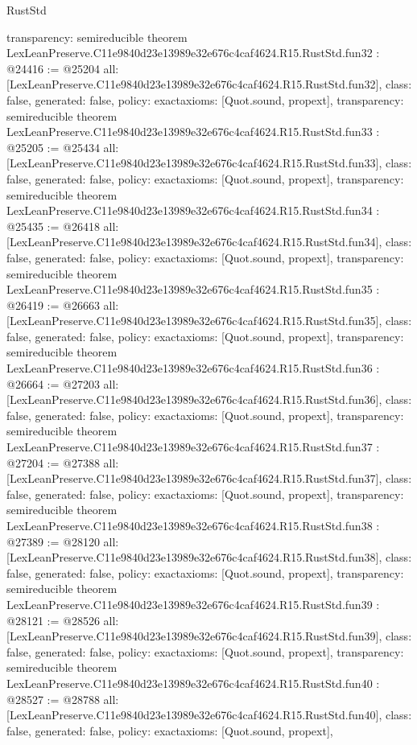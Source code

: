 \begin{lexlean}{RustStd}
\begin{coremodule}
{  transparency: semireducible
}
theorem LexLeanPreserve.C11e9840d23e13989e32e676c4caf4624.R15.RustStd.fun32 : @24416 := @25204 {
  all: [LexLeanPreserve.C11e9840d23e13989e32e676c4caf4624.R15.RustStd.fun32],
  class: false,
  generated: false,
  policy: exact{axioms: [Quot.sound, propext]},
  transparency: semireducible
}
theorem LexLeanPreserve.C11e9840d23e13989e32e676c4caf4624.R15.RustStd.fun33 : @25205 := @25434 {
  all: [LexLeanPreserve.C11e9840d23e13989e32e676c4caf4624.R15.RustStd.fun33],
  class: false,
  generated: false,
  policy: exact{axioms: [Quot.sound, propext]},
  transparency: semireducible
}
theorem LexLeanPreserve.C11e9840d23e13989e32e676c4caf4624.R15.RustStd.fun34 : @25435 := @26418 {
  all: [LexLeanPreserve.C11e9840d23e13989e32e676c4caf4624.R15.RustStd.fun34],
  class: false,
  generated: false,
  policy: exact{axioms: [Quot.sound, propext]},
  transparency: semireducible
}
theorem LexLeanPreserve.C11e9840d23e13989e32e676c4caf4624.R15.RustStd.fun35 : @26419 := @26663 {
  all: [LexLeanPreserve.C11e9840d23e13989e32e676c4caf4624.R15.RustStd.fun35],
  class: false,
  generated: false,
  policy: exact{axioms: [Quot.sound, propext]},
  transparency: semireducible
}
theorem LexLeanPreserve.C11e9840d23e13989e32e676c4caf4624.R15.RustStd.fun36 : @26664 := @27203 {
  all: [LexLeanPreserve.C11e9840d23e13989e32e676c4caf4624.R15.RustStd.fun36],
  class: false,
  generated: false,
  policy: exact{axioms: [Quot.sound, propext]},
  transparency: semireducible
}
theorem LexLeanPreserve.C11e9840d23e13989e32e676c4caf4624.R15.RustStd.fun37 : @27204 := @27388 {
  all: [LexLeanPreserve.C11e9840d23e13989e32e676c4caf4624.R15.RustStd.fun37],
  class: false,
  generated: false,
  policy: exact{axioms: [Quot.sound, propext]},
  transparency: semireducible
}
theorem LexLeanPreserve.C11e9840d23e13989e32e676c4caf4624.R15.RustStd.fun38 : @27389 := @28120 {
  all: [LexLeanPreserve.C11e9840d23e13989e32e676c4caf4624.R15.RustStd.fun38],
  class: false,
  generated: false,
  policy: exact{axioms: [Quot.sound, propext]},
  transparency: semireducible
}
theorem LexLeanPreserve.C11e9840d23e13989e32e676c4caf4624.R15.RustStd.fun39 : @28121 := @28526 {
  all: [LexLeanPreserve.C11e9840d23e13989e32e676c4caf4624.R15.RustStd.fun39],
  class: false,
  generated: false,
  policy: exact{axioms: [Quot.sound, propext]},
  transparency: semireducible
}
theorem LexLeanPreserve.C11e9840d23e13989e32e676c4caf4624.R15.RustStd.fun40 : @28527 := @28788 {
  all: [LexLeanPreserve.C11e9840d23e13989e32e676c4caf4624.R15.RustStd.fun40],
  class: false,
  generated: false,
  policy: exact{axioms: [Quot.sound, propext]},
}
\end{coremodule}
\end{lexlean}
